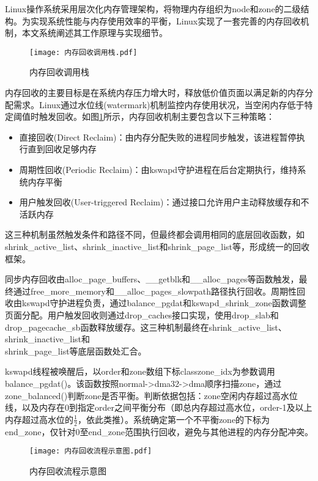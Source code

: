 Linux操作系统采用层次化内存管理架构，将物理内存组织为node和zone的二级结构。为实现系统性能与内存使用效率的平衡，Linux实现了一套完善的内存回收机制，本文系统阐述其工作原理与实现细节。

\begin{figure}[h]
    \centering
    \texttt{[image: 内存回收调用栈.pdf]}
    \caption{内存回收调用栈}
    \label{fig:memory_reclaim_callgraph}
\end{figure}

内存回收的主要目标是在系统内存压力增大时，释放低价值页面以满足新的内存分配需求。Linux通过水位线(watermark)机制监控内存使用状况，当空闲内存低于特定阈值时触发回收。如图\ref{fig:memory_reclaim_callgraph}所示，内存回收机制主要包含以下三种策略：

\begin{itemize}
    \item 直接回收(Direct Reclaim)：由内存分配失败的进程同步触发，该进程暂停执行直到回收足够内存
    \item 周期性回收(Periodic Reclaim)：由kswapd守护进程在后台定期执行，维持系统内存平衡
    \item 用户触发回收(User-triggered Reclaim)：通过接口允许用户主动释放缓存和不活跃内存
\end{itemize}

这三种机制虽然触发条件和路径不同，但最终都会调用相同的底层回收函数，如shrink\_active\_list、shrink\_inactive\_list和shrink\_page\_list等，形成统一的回收框架。

同步内存回收由alloc\_page\_buffers、\_\_getblk和\_\_alloc\_pages等函数触发，最终通过free\_more\_memory和\_\_alloc\_pages\_slowpath路径执行回收。周期性回收由kswapd守护进程负责，通过balance\_pgdat和kswapd\_shrink\_zone函数调整页面分配。用户触发回收则通过drop\_caches接口实现，使用drop\_slab和drop\_pagecache\_sb函数释放缓存。这三种机制最终在shrink\_active\_list、shrink\_inactive\_list和\\shrink\_page\_list等底层函数处汇合。

kswapd线程被唤醒后，以order和zone数组下标classzone\_idx为参数调用balance\_pgdat()。该函数按照normal->dma32->dma顺序扫描zone，通过zone\_balanced()判断zone是否平衡。判断依据包括：zone空闲内存超过高水位线，以及内存在0到指定order之间平衡分布（即总内存超过高水位，order-1及以上内存超过高水位的\(\frac{1}{2}\)，依此类推）。系统确定第一个不平衡zone的下标为end\_zone，仅针对0至end\_zone范围执行回收，避免与其他进程的内存分配冲突。

\begin{figure}[h]
    \centering
    \texttt{[image: 内存回收流程示意图.pdf]}
    \caption{内存回收流程示意图}
    \label{fig:memory_reclaim_mechanism}
\end{figure}

